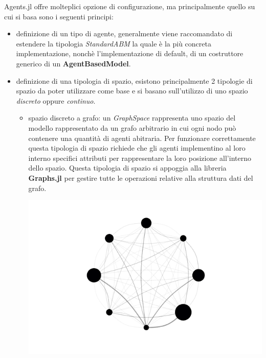 Agents.jl offre molteplici opzione di configurazione, ma 
principalmente quello su cui si basa sono i seguenti principi:

\begin{itemize}
    \item definizione di un tipo di agente, generalmente viene raccomandato di 
    estendere la tipologia \emph{StandardABM} la quale è la più concreta implementazione,
    nonchè l'implementazione di default, di un costruttore generico di un \textbf{AgentBasedModel}.
    \item definizione di una tipologia di spazio, esistono principalmente 2 tipologie 
    di spazio da poter utilizzare come base e si basano sull'utilizzo di uno spazio \emph{discreto}
    oppure \emph{continuo}.
    \begin{itemize}
        \item spazio discreto a grafo: un \emph{GraphSpace} rappresenta uno spazio del modello
        rappresentato da un grafo arbitrario in cui ogni nodo può contenere una 
        quantità di agenti abitraria. Per funzionare correttamente questa tipologia di 
        spazio richiede che gli agenti implementino al loro interno specifici attributi
        per rappresentare la loro posizione all'interno dello spazio. Questa tipologia di spazio
        si appoggia alla libreria \textbf{Graphs.jl} \cite{Graphs2021} per gestire tutte le operazioni relative
        alla struttura dati del grafo.  

        \begin{minipage}{\linewidth}
            \centering
            \includegraphics[width=\textwidth]{img/graph.png}
            \label{fig:graphspace_representation}
        \end{minipage}
        

\end{itemize}
\end{itemize}
